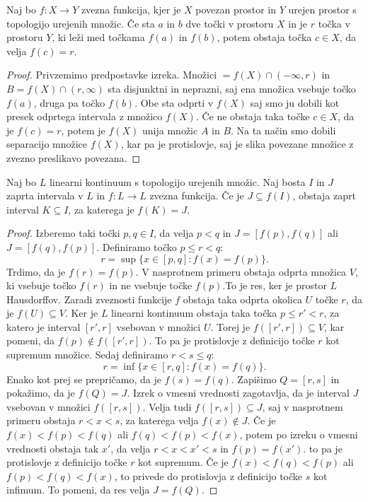 \documentclass[mat2]{fmfdelo}
\begin{document}
\begin{izrek}
Naj bo $f : X \to Y$ zvezna funkcija, kjer je $X$ povezan prostor in $Y$ urejen prostor s topologijo urejenih množic. Če sta $a$ in $b$ dve točki v prostoru $X$ in je $r$ točka v prostoru $Y$, ki leži med točkama $f(a)$ in $f(b)$, potem obstaja točka $c \in X$, da velja $f(c) = r$.
\end{izrek}
\begin{proof}
Privzemimo predpostavke izreka. Množici $=f(X) \cap (-\infty, r)$ in $B=f(X) \cap (r, \infty)$ sta disjunktni in neprazni, saj ena množica vsebuje točko $f(a)$, druga pa točko $f(b)$. Obe sta odprti v $f(X)$ saj smo ju dobili kot presek odprtega intervala z množico $f(X)$. Če ne obstaja taka točke $c \in X$, da je $f(c) = r$, potem je $f(X)$ unija množic $A$ in $B$. Na ta način smo dobili separacijo množice $f(X)$, kar pa je protislovje, saj je slika povezane množice z zvezno preslikavo povezana.
\end{proof}

\begin{lema}
Naj bo $L$ linearni kontinuum s topologijo urejenih množic. Naj bosta $I$ in $J$ zaprta intervala v $L$ in $f:L \to L$ zvezna funkcija. Če je $J \subseteq f(I)$, obstaja zaprt interval $K \subseteq I$, za katerega je $f(K) = J$.
\end{lema}
\begin{proof}
Izberemo taki točki $p, q \in I$, da velja $p<q$ in $J=[f(p), f(q)]$ ali $J=[f(q), f(p)]$. Definiramo točko $p \leq r < q$:
$$r= \sup\{x \in [p, q] : f(x) = f(p)\}.$$
Trdimo, da je $f(r) = f(p)$. V nasprotnem primeru obstaja odprta množica $V$, ki vsebuje točko $f(r)$ in ne vsebuje točke $f(p)$.To je res, ker je prostor $L$ Hausdorffov. Zaradi zveznosti funkcije $f$ obstaja taka odprta okolica $U$ točke $r$, da je $f(U) \subseteq V$. Ker je $L$ linearni kontinuum obstaja taka točka $p \leq r' < r$, za katero je interval $[r', r]$ vsebovan v množici $U$. Torej je $f([r', r]) \subseteq V$, kar pomeni, da $f(p) \notin f([r', r])$. To pa je protislovje z definicijo točke $r$ kot supremum množice.
Sedaj definiramo $r<s \leq q$:
$$r= \inf\{x \in [r, q] : f(x) = f(q)\}.$$ 
Enako kot prej se prepričamo, da je $f(s) = f(q)$. Zapišimo $Q = [r, s]$ in pokažimo, da je $f(Q) = J$. Izrek o vmesni vrednosti zagotavlja, da je interval $J$ vsebovan v množici $f([r, s])$. Velja tudi $f([r, s]) \subseteq J$, saj v nasprotnem primeru obstaja $r<x<s$, za katerega velja $f(x) \notin J$. Če je $f(x) < f(p) < f(q)$ ali $f(q) < f(p) < f(x)$, potem po izreku o vmesni vrednosti obstaja tak $x'$, da velja $r<x<x'<s$ in $f(p) = f(x')$. to pa je protislovje z definicijo točke $r$ kot supremum. Če je $f(x) < f(q) < f(p)$ ali $f(p) < f(q) < f(x)$, to privede do protislovja z definicijo točke $s$ kot infimum. To pomeni, da res velja $J = f(Q)$.
\end{proof}
\end{document}
